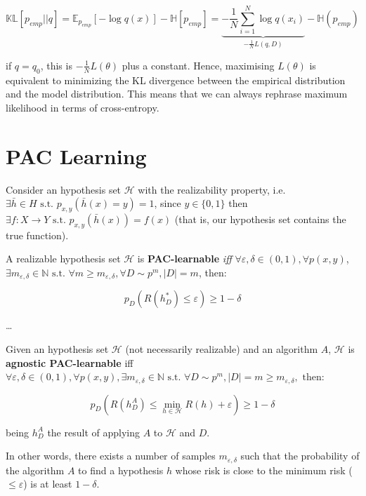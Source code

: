 $$
\mathbb{KL}[p_{emp}||q] = \mathbb{E}_{p_{emp}}[-\log q(x)] - \mathbb{H}[p_{emp}] = \underbrace{- \dfrac 1N \sum_{i=1}^N \log q(x_i)}_{- \frac 1N L(q, D)} - \mathbb{H}(p_{emp})
$$

if $q = q_0$, this is $- \frac 1N L(\theta)$ plus a constant. Hence, maximising $L(\theta)$ is equivalent to minimizing the KL divergence between the empirical distribution and the model distribution. This means that we can always rephrase maximum likelihood in terms of cross-entropy.

\section{PAC Learning}

Consider an hypothesis set $\mathcal{H}$ with the realizability property, i.e. $\exists \bar h \in H \text{ s.t. } p_{x,y}(\bar h(x) = y) = 1$, since $y \in \{0, 1\}$ then $\exists f : X \rightarrow Y \text{ s.t. } p_{x,y}(\bar h(x)) = f(x)$ (that is, our hypothesis set contains the true function).

\begin{definitionblock}
    A realizable hypothesis set $\mathcal{H}$ is \textbf{PAC-learnable} \textit{iff} $\forall \varepsilon, \delta \in (0,1), \forall p(x,y)$, $\exists m_{\varepsilon, \delta} \in \mathbb{N} \text{ s.t. } \forall m \ge m_{\varepsilon, \delta}, \forall D \sim p^m, |D| = m$, then:

    $$
    p_D(R(h_D^*) \le \varepsilon) \ge 1 - \delta
    $$
\end{definitionblock}

\vspace{10em}
\dots
\vspace{10em}

\begin{definitionblock}
    Given an hypothesis set $\mathcal{H}$ (not necessarily realizable) and an algorithm $A$, $\mathcal{H}$ is \textbf{agnostic PAC-learnable} iff $\forall \varepsilon, \delta \in (0,1), \forall p(x,y), \exists m_{\varepsilon, \delta} \in \mathbb{N} \text{ s.t. } \forall D \sim p^m, |D| = m \ge m_{\varepsilon, \delta}, \text{ then:}$

    $$
    p_D(R(h_D^A) \le \min_{h \in \mathcal{H}} R(h) + \varepsilon) \ge 1 - \delta 
    $$

    being $h_D^A$ the result of applying $A$ to $\mathcal{H}$ and $D$.
\end{definitionblock}

In other words, there exists a number of samples $m_{\varepsilon, \delta}$ such that the probability of the algorithm $A$ to find a hypothesis $h$ whose risk is close to the minimum risk ($\le \varepsilon$) is at least $1 - \delta$.

